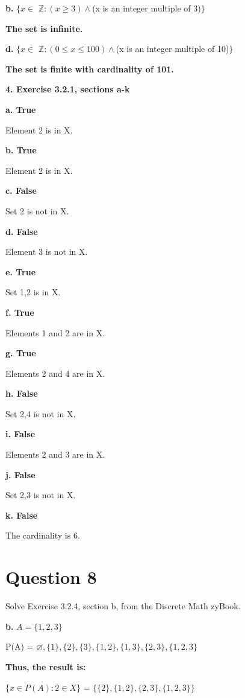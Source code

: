 \documentclass[11pt]{article}
\begin{document}
	\textbf{b.}
	$\{x\in$ $\mathbb{Z}:(x\geq 3)\wedge$(x is an integer multiple of 3)$\}$
	
	\textbf{The set is infinite.}
	
	\textbf{d.}
	$\{x\in$ $\mathbb{Z}:(0\leq x\leq 100)\wedge$(x is an integer multiple of 10)$\}$
	
	\textbf{The set is finite with cardinality of 101.}
	
	\vspace{10mm}
	\textbf{4. Exercise 3.2.1, sections a-k}
	
	\textbf{a. True}
	
	Element 2 is in X.
	
	\textbf{b. True}
	
	Element 2 is in X.
	
	\textbf{c. False}
	
	Set 2 is not in X.
	
	\textbf{d. False}
	
	Element 3 is not in X.
	
	\textbf{e. True}
	
	Set 1,2 is in X. 
	
	\textbf{f. True}
	
	Elements 1 and 2 are in X.
	
	\textbf{g. True}
	
	Elements 2 and 4 are in X.
	
	\textbf{h. False}
	
	Set 2,4 is not in X.
	
	\textbf{i. False}
	
	Elements 2 and 3 are in X.
	
	\textbf{j. False}
	
	Set 2,3 is not in X.
	
	\textbf{k. False}
	
	The cardinality is 6.
	
	\newpage
	\section*{Question 8}
	
	Solve Exercise 3.2.4, section b, from the Discrete Math zyBook.
	
	\textbf{b.}
	$A=\{ 1,2,3\}$
	
	P(A) = $\varnothing, \{1\}, \{2\}, \{3\}, \{1,2\}, \{1,3\}, \{2,3\}, \{1,2,3\}$
	
	\textbf{Thus, the result is:}
	
	$\{x\in P(A): 2\in X\}$ = $\{ \{2\}, \{1,2\}, \{2,3\}, \{1,2,3\}\}$
	
\end{document}
